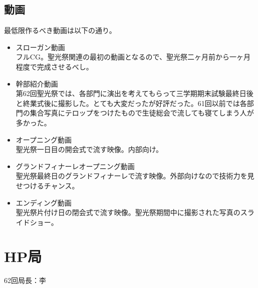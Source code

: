 \documentclass[dvipdfmx,jb5]{jarticle}
\begin{document}
\subsection{動画}
最低限作るべき動画は以下の通り。
 \begin{itemize}
  \item スローガン動画\\
  フルCG。聖光祭関連の最初の動画となるので、聖光祭二ヶ月前から一ヶ月程度で完成させるべし。
  \item 幹部紹介動画\\
  第62回聖光祭では、各部門に演出を考えてもらって三学期期末試験最終日後と終業式後に撮影した。とても大変だったが好評だった。61回以前では各部門の集合写真にテロップをつけたもので生徒総会で流しても寝てしまう人が多かった。

  \item オープニング動画\\
  聖光祭一日目の開会式で流す映像。内部向け。
  \item グランドフィナーレオープニング動画\\
  聖光祭最終日のグランドフィナーレで流す映像。外部向けなので技術力を見せつけるチャンス。
  \item エンディング動画\\
  聖光祭片付け日の閉会式で流す映像。聖光祭期間中に撮影された写真のスライドショー。
 \end{itemize}
 \newpage
  \section{HP局}
 62回局長：李
\end{document}
